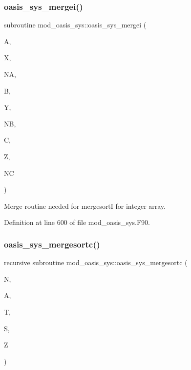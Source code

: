 \subsubsection{\texorpdfstring{oasis\+\_\+sys\+\_\+mergei()}{oasis\_sys\_mergei()}}
{\footnotesize\ttfamily subroutine mod\+\_\+oasis\+\_\+sys\+::oasis\+\_\+sys\+\_\+mergei (\begin{DoxyParamCaption}\item[{integer(in), dimension(na), intent(inout)}]{A,  }\item[{integer(in), dimension(na), intent(inout)}]{X,  }\item[{integer, intent(in)}]{NA,  }\item[{integer(in), dimension(nb), intent(in)}]{B,  }\item[{integer(in), dimension(nb), intent(in)}]{Y,  }\item[{integer, intent(in)}]{NB,  }\item[{integer(in), dimension(nc), intent(inout)}]{C,  }\item[{integer(in), dimension(nc), intent(inout)}]{Z,  }\item[{integer, intent(in)}]{NC }\end{DoxyParamCaption})\hspace{0.3cm}{\ttfamily [private]}}



Merge routine needed for mergesortI for integer array. 



Definition at line 600 of file mod\+\_\+oasis\+\_\+sys.\+F90.

\mbox{\label{namespacemod__oasis__sys_a30b91b7cab02c85d85fb7a7debdd5ec2}} 
\subsubsection{\texorpdfstring{oasis\+\_\+sys\+\_\+mergesortc()}{oasis\_sys\_mergesortc()}}
{\footnotesize\ttfamily recursive subroutine mod\+\_\+oasis\+\_\+sys\+::oasis\+\_\+sys\+\_\+mergesortc (\begin{DoxyParamCaption}\item[{integer, intent(in)}]{N,  }\item[{character(cl), dimension(n), intent(inout)}]{A,  }\item[{character(cl), dimension((n+1)/2), intent(out)}]{T,  }\item[{integer(in), dimension(n), intent(inout)}]{S,  }\item[{integer(in), dimension((n+1)/2), intent(out)}]{Z }\end{DoxyParamCaption})\hspace{0.3cm}{\ttfamily [private]}}



